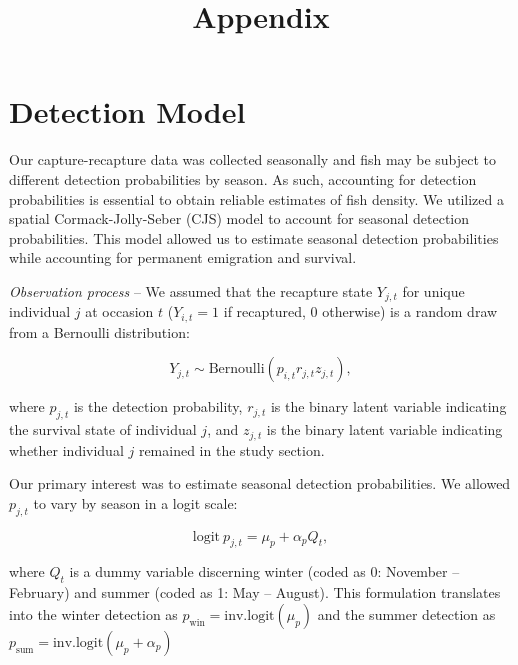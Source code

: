 \documentclass[11pt, class=article, crop=false]{standalone}
\title{Appendix}
\date{} %
\author{}
\begin{document}
\renewcommand{\theequation}{S\arabic{equation}}
\renewcommand{\thetable}{S\arabic{table}}
\renewcommand{\thefigure}{S\arabic{figure}}

\maketitle

\tableofcontents

\newpage

\section{Detection Model}

Our capture-recapture data was collected seasonally and fish may be subject to different detection probabilities by season.
As such, accounting for detection probabilities is essential to obtain reliable estimates of fish density.
We utilized a spatial Cormack-Jolly-Seber (CJS) model \citep{schaubEstimatingTrueInstead2014} to account for seasonal detection probabilities. 
This model allowed us to estimate seasonal detection probabilities while accounting for permanent emigration and survival.

\textit{Observation process} -- 
We assumed that the recapture state $Y_{j,t}$ for unique individual $j$ at occasion $t$ ($Y_{i,t} = 1$ if recaptured, $0$ otherwise) is a random draw from a Bernoulli distribution:

\begin{equation}
    Y_{j,t} \sim \text{Bernoulli}(p_{i,t} r_{j, t} z_{j,t}),
\end{equation}

where $p_{j,t}$ is the detection probability, $r_{j, t}$ is the binary latent variable indicating the survival state of individual $j$, and $z_{j, t}$ is the binary latent variable indicating whether individual $j$ remained in the study section.

Our primary interest was to estimate seasonal detection probabilities.
We allowed $p_{j, t}$ to vary by season in a logit scale:

\begin{equation}
    \text{logit}~p_{j,t} = \mu_p + \alpha_p Q_{t},
\end{equation}

where $Q_{t}$ is a dummy variable discerning winter (coded as 0: November -- February) and summer (coded as 1: May -- August).
This formulation translates into the winter detection as $p_{\text{win}} = \text{inv.logit}(\mu_p)$ and the summer detection as $p_{\text{sum}} = \text{inv.logit}(\mu_p + \alpha_p)$
\end{document}
